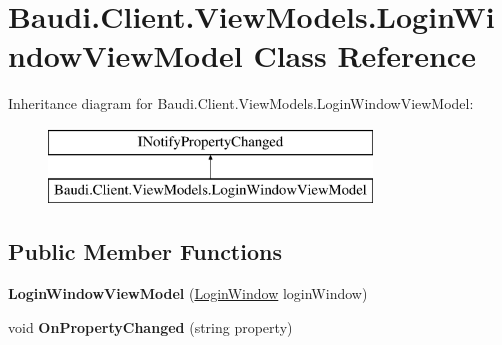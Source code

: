 \hypertarget{class_baudi_1_1_client_1_1_view_models_1_1_login_window_view_model}{}\section{Baudi.\+Client.\+View\+Models.\+Login\+Window\+View\+Model Class Reference}
\label{class_baudi_1_1_client_1_1_view_models_1_1_login_window_view_model}
Inheritance diagram for Baudi.\+Client.\+View\+Models.\+Login\+Window\+View\+Model\+:\begin{figure}[H]
\begin{center}
\leavevmode
\includegraphics[height=2.000000cm]{class_baudi_1_1_client_1_1_view_models_1_1_login_window_view_model}
\end{center}
\end{figure}
\subsection*{Public Member Functions}
\begin{DoxyCompactItemize}
\item 
\hypertarget{class_baudi_1_1_client_1_1_view_models_1_1_login_window_view_model_a072433d69666fb709744c0680a40c458}{}{\bfseries Login\+Window\+View\+Model} (\hyperlink{class_baudi_1_1_client_1_1_view_1_1_login_window}{Login\+Window} login\+Window)\label{class_baudi_1_1_client_1_1_view_models_1_1_login_window_view_model_a072433d69666fb709744c0680a40c458}

\item 
\hypertarget{class_baudi_1_1_client_1_1_view_models_1_1_login_window_view_model_a742c34e297f04ad0692ccee49ab56dc5}{}void {\bfseries On\+Property\+Changed} (string property)\label{class_baudi_1_1_client_1_1_view_models_1_1_login_window_view_model_a742c34e297f04ad0692ccee49ab56dc5}

\end{DoxyCompactItemize}
